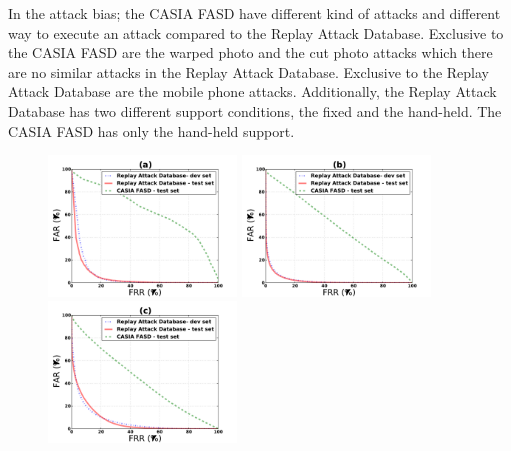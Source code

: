 In the attack bias; the CASIA FASD have different kind of attacks and different way to execute an attack compared to the Replay Attack Database. Exclusive to the CASIA FASD are the warped photo and the cut photo attacks which there are no similar attacks in the Replay Attack Database. Exclusive to the Replay Attack Database are the mobile phone attacks. Additionally, the Replay Attack Database has two different support conditions, the fixed and the hand-held. The CASIA FASD has only the hand-held support.


\begin{figure}[ht]
\begin{center}
\includegraphics [width=5cm] {plots/CROSS-DATABASE/MOTION/roc_replay-machine.pdf} 
\includegraphics [width=5cm] {plots/CROSS-DATABASE/LBPTOP/roc_replay-machine.pdf}
\includegraphics [width=5cm] {plots/CROSS-DATABASE/LBP/roc_replay-machine.pdf}


\end{center}
\end{figure}
